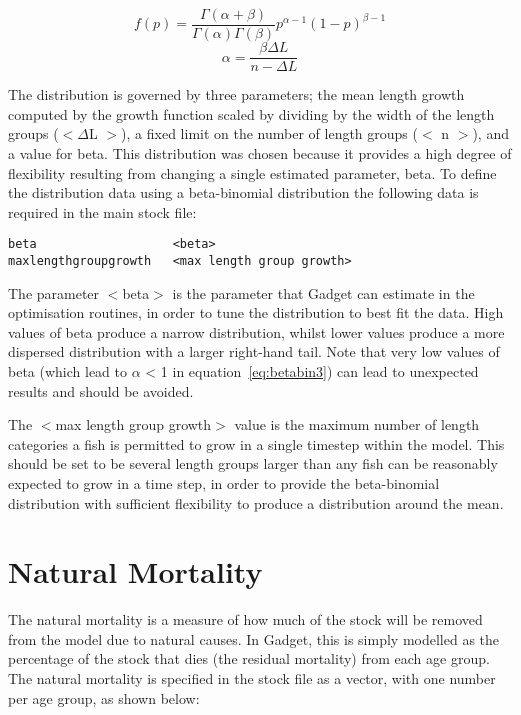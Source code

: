\documentclass [a4paper, 10pt]{book}
\begin{document}
\begin{equation}\label{eq:betabin2}
f(p)=\frac{\Gamma(\alpha+\beta)}{\Gamma(\alpha)\Gamma(\beta)}p^{\alpha-1}(1-p)^{\beta-1}
\end{equation}
\begin{equation}\label{eq:betabin3}
\alpha=\frac{\beta\Delta L}{n-\Delta L}
\end{equation}

The distribution is governed by three parameters; the mean length growth computed by the growth function scaled by dividing by the width of the length groups ($<\Delta$L $>$), a fixed limit on the number of length groups ($<$ n $>$), and a value for beta.  This distribution was chosen because it provides a high degree of flexibility resulting from changing a single estimated parameter, beta.  To define the distribution data using a beta-binomial distribution the following data is required in the main stock file:

{\small\begin{verbatim}
beta                   <beta>
maxlengthgroupgrowth   <max length group growth>
\end{verbatim}}

The parameter $<$beta$>$ is the parameter that Gadget can estimate in the optimisation routines, in order to tune the distribution to best fit the data.  High values of beta produce a narrow distribution, whilst lower values produce a more dispersed distribution with a larger right-hand tail.  Note that very low values of beta (which lead to $\alpha$ < 1 in equation~\ref{eq:betabin3}) can lead to unexpected results and should be avoided.

\bigskip
The $<$max length group growth$>$ value is the maximum number of length categories a fish is permitted to grow in a single timestep within the model.  This should be set to be several length groups larger than any fish can be reasonably expected to grow in a time step, in order to provide the beta-binomial distribution with sufficient flexibility to produce a distribution around the mean.

\section{Natural Mortality}\label{sec:stocknatmort}
The natural mortality is a measure of how much of the stock will be removed from the model due to natural causes.  In Gadget, this is simply modelled as the percentage of the stock that dies (the residual mortality) from each age group.  The natural mortality is specified in the stock file as a vector, with one number per age group, as shown below:
\end{document}
